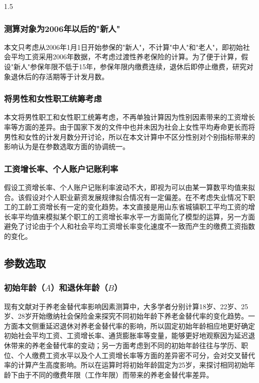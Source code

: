 \documentclass[a4paper,12pt]{ctexart}
\numberwithin{equation}{section}
\begin{document}
\begin{spacing}{1.5}
\subsubsection{测算对象为2006年以后的"新人"}

本文只考虑从2006年1月1日开始参保的"新人"，不计算"中人"和"老人"，即初始社会平均工资采用2006年数据，不考虑过渡性养老保险的计算。为了便于计算，假设"新人"参保年限不低于15年，参保年限内缴费连续，退休后即停止缴费，研究对象退休后的存活期等于计发月数。

\subsubsection{将男性和女性职工统筹考虑}

本文将男性职工和女性职工统筹考虑，不再单独计算因为性别因素带来的工资增长率等方面的差异。由于国家下发的文件中也并未因为社会上女性平均寿命更长而将男性和女性的计发月数分开讨论，所以在本文计算中不区分性别对个别指标带来的影响认为是在参数选取方面的协调统一。

\subsubsection{工资增长率、个人账户记账利率}

假设工资增长率、个人账户记账利率波动不大，即视为可以由某一算数平均值来拟合。该假设对个人职业薪资发展规律拟合情况有一定偏差。在不考虑失业情况下职工的工龄工资增长有一定的变化趋势。本文直接是用山东省城镇职工平均工资的增长率平均值来模拟某个职工的工资增长率水平一方面简化了模型的运算，另一方面避免了讨论由于个人和社会平均工资增长率变化速度不一致而产生的缴费工资指数的变化。

\subsection{参数选取}

\subsubsection{初始年龄（$A$）和退休年龄（$B$）}

现有文献对于养老金替代率影响因素测算中，大多学者分别计算18岁、22岁、25岁、28岁开始缴纳社会保险金来探究不同初始年龄下养老金替代率的变化趋势。一方面本文侧重延迟退休对养老金替代率的影响，所以固定初始年龄相应地更好确定初始社会平均工资、工资增长率、通货膨胀率等变量，能够更好地观察因为延迟退休带来的养老金替代率的变动；另一方面考虑到不同的初始年龄往往与学历、职位、个人缴费工资水平以及个人工资增长率等方面的差异密不可分，会对交叉替代率的计算产生高度影响。所以在运算时将初始年龄固定为25岁，来探讨相同初始年龄下由于不同的缴费年限（工作年限）而带来的养老金替代率差异。


\end{spacing}
\end{document}
